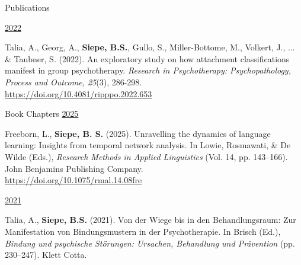 \documentclass{resume} %
\begin{document}
\begin{rSection}{Publications}
\begin{etaremune}
\hspace{-0.75cm}\underline{2022}

\item Talia, A., Georg, A., \textbf{Siepe, B.S.}, Gullo, S., Miller-Bottome, M., Volkert, J., ... \& Taubner, S. (2022). An exploratory study on how attachment classifications manifest in group psychotherapy. \textit{Research in Psychotherapy: Psychopathology, Process and Outcome, 25}(3), 286-298. \\ \url{https://doi.org/10.4081/ripppo.2022.653}



\end{etaremune}



\end{rSection}


\begin{rSection}{Book Chapters}
\underline{2025}
\begin{etaremune}

\item Freeborn, L., \textbf{Siepe, B. S.} (2025). Unravelling the dynamics of language learning: Insights from temporal network analysis. In Lowie, Rosmawati, \& De Wilde (Eds.), \textit{Research Methods in Applied Linguistics} (Vol. 14, pp. 143--166). John Benjamins Publishing Company. \\
\url{https://doi.org/10.1075/rmal.14.08fre}


\hspace{-0.75cm}\underline{2021}
\item Talia, A., \textbf{Siepe, B.S.} (2021). Von der Wiege bis in den Behandlungsraum: Zur Manifestation von Bindungsmustern in der Psychotherapie. In Brisch (Ed.), \textit{Bindung und psychische Störungen: Ursachen, Behandlung und Prävention} (pp. 230--247). Klett Cotta. \\

\end{etaremune}
\end{rSection}
\end{document}
